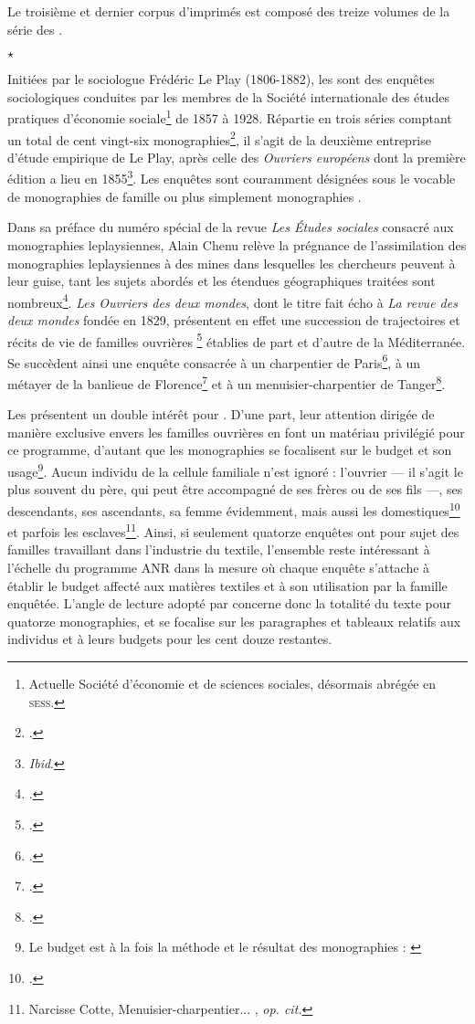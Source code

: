 Le troisième et dernier corpus d'imprimés est composé des treize volumes de la série des \odm.

\begin{center}
$\star$
\end{center} 

Initiées par le sociologue Frédéric Le Play (1806-1882), les \odm{} sont des enquêtes sociologiques conduites par les membres de la Société internationale des études pratiques d’économie sociale\footnote{Actuelle Société d'économie et de sciences sociales, désormais abrégée en \textsc{sess}.} de 1857 à 1928. Répartie en trois séries comptant un total de cent vingt-six monographies\footnote{\cite[p. 95]{lorry}.}, il s'agit de la deuxième entreprise d'étude empirique de Le Play, après celle des \textit{Ouvriers européens} dont la première édition a lieu en 1855\footnote{\textit{Ibid}.}. Les enquêtes sont couramment désignées sous le vocable de \og monographies de famille \fg{} ou plus simplement \og monographies \fg{}.

Dans sa préface du numéro spécial de la revue \textit{Les Études sociales} consacré aux monographies leplaysiennes, Alain Chenu relève la prégnance de l'assimilation des monographies leplaysiennes à des \og mines \fg{} dans lesquelles les chercheurs peuvent \og [puiser] \fg{} à leur guise, tant les sujets abordés et les étendues géographiques traitées sont nombreux\footnote{\cite[p. 5]{chenu}.}. \textit{Les Ouvriers des deux mondes}, dont le titre fait écho à \textit{La revue des deux mondes} fondée en 1829, présentent en effet une succession de \og trajectoires et récits de vie de familles ouvrières \fg{}\footnote{\cite[p. 193]{baciocchi}.} établies de part et d'autre de la Méditerranée. Se succèdent ainsi une enquête consacrée à un charpentier de Paris\footcite{mono001a}, à un métayer de la banlieue de Florence\footcite{mono005a} et à un menuisier-charpentier de Tanger\footcite{mono012a}.

Les \odm{} présentent un double intérêt pour \timeus. D'une part, leur attention dirigée de manière exclusive envers les familles ouvrières en font un matériau privilégié pour ce programme, d'autant que les monographies se focalisent sur le budget et son usage\footnote{Le budget est \og à la fois la méthode et le résultat \fg{} des monographies : \cite[p. 11]{cardoni}}. Aucun individu de la cellule familiale n'est ignoré : l'ouvrier --- il s'agit le plus souvent du père, qui peut être accompagné de ses frères ou de ses fils ---, ses descendants, ses ascendants, sa femme évidemment, mais aussi les domestiques\footcite{mono018a} et parfois les esclaves\footnote{Narcisse Cotte, \og Menuisier-charpentier... \fg{}, \textit{op. cit.}}. Ainsi, si seulement quatorze enquêtes ont pour sujet des familles travaillant dans l'industrie du textile, l'ensemble reste intéressant à l'échelle du programme ANR dans la mesure où chaque enquête s'attache à établir le budget affecté aux matières textiles et à son utilisation par la famille enquêtée. L'angle de lecture adopté par \timeus{} concerne donc la totalité du texte pour quatorze monographies, et se focalise sur les paragraphes et tableaux relatifs aux individus et à leurs budgets pour les cent douze restantes.

